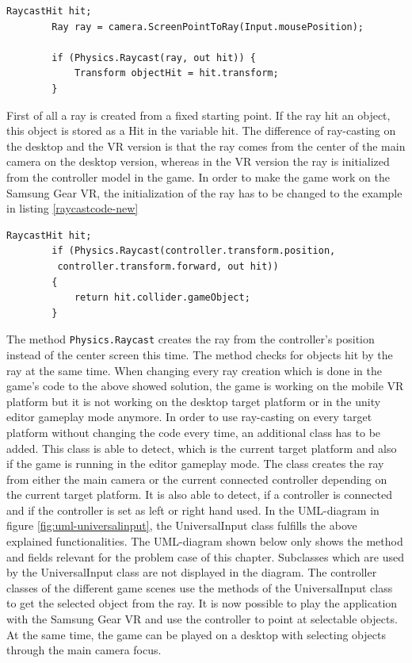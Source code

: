 \begin{lstlisting} 
RaycastHit hit;
        Ray ray = camera.ScreenPointToRay(Input.mousePosition);
        
        if (Physics.Raycast(ray, out hit)) {
            Transform objectHit = hit.transform;
        }
\end{lstlisting}
\label{raycastcode}
First of all a ray is created from a fixed starting point. If the ray hit an object, this object is stored as a Hit in the variable hit. The difference of ray-casting on the desktop and the VR version is that the ray comes from the center of the main camera on the desktop version, whereas in the VR version the ray is initialized from the controller model in the game. In order to make the game work on the Samsung Gear VR, the initialization of the ray has to be changed to the example in listing \ref{raycastcode-new}
\begin{lstlisting} 
RaycastHit hit;
        if (Physics.Raycast(controller.transform.position,
         controller.transform.forward, out hit))
        {
            return hit.collider.gameObject;
        }
\end{lstlisting}
\label{raycastcode-new}

The method \texttt{Physics.Raycast} creates the ray from the controller's position instead of the center screen this time. The method checks for objects hit by the ray at the same time.
When changing every ray creation which is done in the game's code to the above showed solution, the game is working on the mobile VR platform but it is not working on the desktop target platform or in the unity editor gameplay mode anymore. In order to use ray-casting on every target platform without changing the code every time, an additional class has to be added. This class is able to detect, which is the current target platform and also if the game is running in the editor gameplay mode. The class creates the ray from either the main camera or the current connected controller depending on the current target platform. It is also able to detect, if a controller is connected and if the controller is set as left or right hand used. In the UML-diagram in figure \ref{fig:uml-universalinput}, the UniversalInput class fulfills the above explained functionalities. The UML-diagram shown below only shows the method and fields relevant for the problem case of this chapter. Subclasses which are used by the UniversalInput class are not displayed in the diagram. The controller classes of the different game scenes use the methods of the UniversalInput class to get the selected object from the ray. It is now possible to play the application with the Samsung Gear VR and use the controller to point at selectable objects. At the same time, the game can be played on a desktop with selecting objects through the main camera focus.

